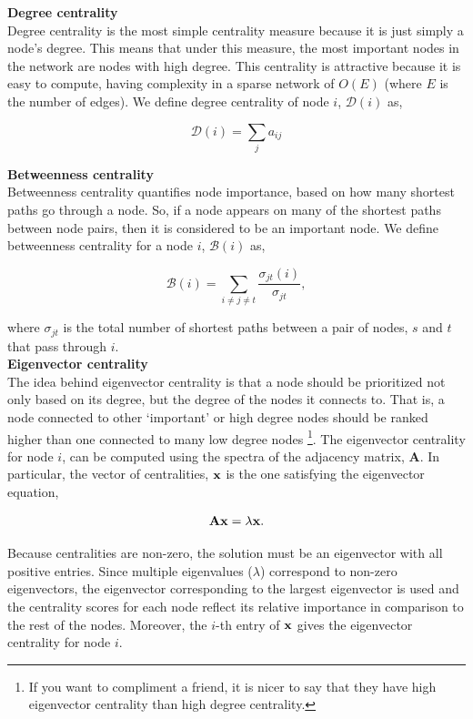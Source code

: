 {\bf Degree centrality}\\
Degree centrality is the most simple centrality measure because it is just simply a node's degree. This means that under this measure, the most important nodes in the network are nodes with high degree. This centrality is attractive because it is easy to compute, having complexity in a sparse network of $O(E)$ (where $E$ is the number of edges). We define degree centrality of node $i$, $\mathcal{D}(i)$ as,

\begin{equation}
\mathcal{D}(i)=\sum_{j}a_{ij}
\end{equation}

{\bf Betweenness centrality}\\
Betweenness centrality quantifies node importance, based on how many shortest paths go through a node. So, if a node appears on many of the shortest paths between node pairs, then it is considered to be an important node. We define betweenness centrality for a node $i$, $\mathcal{B}(i)$ as,

\begin{equation}
\mathcal{B}(i)=\sum_{i\ne j\ne t} \frac{\sigma_{jt}(i)}{\sigma_{jt}},
\end{equation}

where $\sigma_{jt}$ is the total number of shortest paths between a pair of nodes, $s$ and $t$ that pass through $i$. \\

{\bf Eigenvector centrality}\\
The idea behind eigenvector centrality is that a node should be prioritized not only based on its degree, but the degree of the nodes it connects to. That is, a node connected to other `important' or high degree nodes should be ranked higher than one connected to many low degree nodes \footnote{If you want to compliment a friend, it is nicer to say that they have high eigenvector centrality than high degree centrality.}. The eigenvector centrality for node $i$, can be computed using the spectra of the adjacency matrix, ${\boldsymbol A}$. In particular, the vector of centralities, ${\bf x}$ is the one satisfying the eigenvector equation,

\begin{equation}
{\bf A}{\bf x}=\lambda{\bf x}.
\end{equation}

Because centralities are non-zero, the solution must be an eigenvector with all positive entries. Since multiple eigenvalues ($\lambda$) correspond to non-zero eigenvectors, the eigenvector corresponding to the largest eigenvector is used and the centrality scores for each node reflect its relative importance in comparison to the rest of the nodes. Moreover, the $i$-th entry of ${\bf x}$ gives the eigenvector centrality for node $i$. \\

